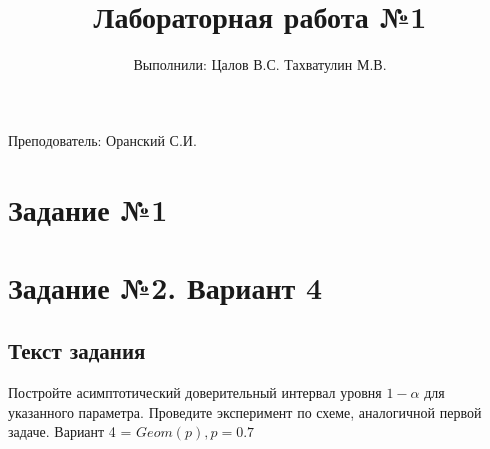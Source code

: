 \documentclass{article}
\title{Лабораторная работа №1}
\author{Выполнили: Цалов В.С. Тахватулин М.В.}
\begin{document}
\maketitle
\begin{center}
      {\fontsize{14}{15}\selectfont
            Преподователь: Оранский С.И.
      }
\end{center}

\section{Задание №1}\label{sec:-no1}

\section{Задание №2. Вариант 4}\label{sec:-no2.--4}

\subsection{Текст задания}\label{subsec:-}
Постройте асимптотический доверительный интервал уровня $1 - \alpha$ для указанного параметра.
Проведите эксперимент по схеме, аналогичной первой задаче.
Вариант 4 = $Geom(p), p = 0.7$
\end{document}
